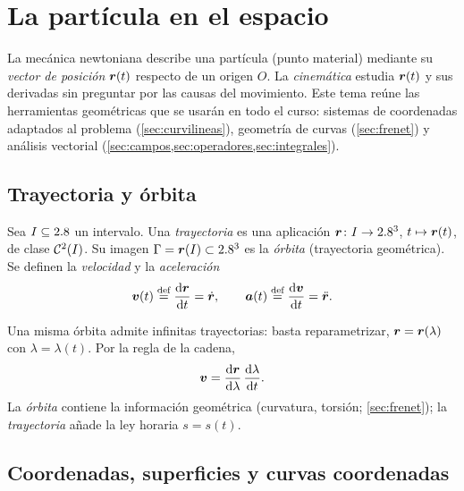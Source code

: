\section{La partícula en el espacio}
\label{sec:particula}

La mecánica newtoniana describe una partícula (punto material) mediante su
\emph{vector de posición} $\bm{r}(t)$ respecto de un origen $O$. La
\emph{cinemática} estudia $\bm{r}(t)$ y sus derivadas sin preguntar por las
causas del movimiento. Este tema reúne las herramientas geométricas que se
usarán en todo el curso: sistemas de coordenadas adaptados al problema
(\cref{sec:curvilineas}), geometría de curvas (\cref{sec:frenet}) y análisis
vectorial (\cref{sec:campos,sec:operadores,sec:integrales}).

\subsection{Trayectoria y órbita}

\begin{definicion}
Sea $I\subseteq2.8$ un intervalo. Una \emph{trayectoria} es una aplicación
$\bm{r}\colon I\to2.8^{3}$, $t\mapsto\bm{r}(t)$, de clase $\mathcal{C}^{2}(I)$. Su imagen
$\Gamma=\bm{r}(I)\subset2.8^{3}$ es la \emph{órbita} (trayectoria geométrica).
Se definen la \emph{velocidad} y la \emph{aceleración}
\begin{equation}
  \bm{v}(t)\stackrel{\text{def}}{=}\frac{\mathop{}\!\mathrm{d} \bm{r}}{\mathop{}\!\mathrm{d} t}=\dot{\bm{r}},\qquad
  \bm{a}(t)\stackrel{\text{def}}{=}\frac{\mathop{}\!\mathrm{d} \bm{v}}{\mathop{}\!\mathrm{d} t}=\ddot{\bm{r}} .
  \label{eq:va-def}
\end{equation}
\end{definicion}

\begin{observacion}
Una misma órbita admite infinitas trayectorias: basta reparametrizar,
$\bm{r}=\bm{r}(\lambda)$ con $\lambda=\lambda(t)$. Por la regla de la cadena,
\begin{equation}
  \bm{v}=\frac{\mathop{}\!\mathrm{d} \bm{r}}{\mathop{}\!\mathrm{d} \lambda}\,\frac{\mathop{}\!\mathrm{d} \lambda}{\mathop{}\!\mathrm{d} t}.
  \label{eq:reparam}
\end{equation}
La \emph{órbita} contiene la información geométrica (curvatura, torsión;
\cref{sec:frenet}); la \emph{trayectoria} añade la ley horaria $s=s(t)$.
\end{observacion}

\subsection{Coordenadas, superficies y curvas coordenadas}

